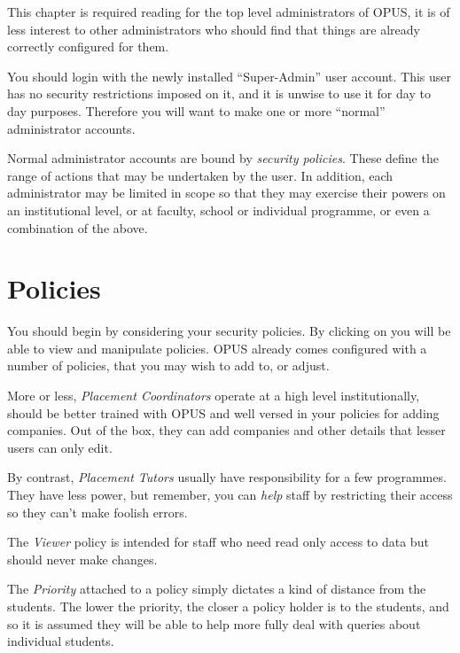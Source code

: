 \documentclass[12 pt]{book}
\begin{document}
This chapter is required reading for the top level administrators of OPUS, it
is of less interest to other administrators who should find that things are
already correctly configured for them.

You should login with the newly installed ``Super-Admin'' user account. This
user has no security restrictions imposed on it, and it is unwise to use it
for day to day purposes. Therefore you will want to make one or more ``normal''
administrator accounts.


Normal administrator accounts are bound by \emph{security policies}. These
define the range of actions that may be undertaken by the user. In addition, 
each administrator may be limited in scope so that they may exercise their
powers on an institutional level, or at faculty, school or individual
programme, or even a combination of the above.

\section{Policies}
\label{Policies}

You should begin by considering your security policies. By clicking on
 you will be able to view and manipulate
policies. OPUS already comes configured with a number of policies, that you may
wish to add to, or adjust.

More or less, \emph{Placement Coordinators} operate at a high level
institutionally, should be better trained with OPUS and well versed in your
policies for adding companies. Out of the box, they can add companies and other
details that lesser users can only edit.

By contrast, \emph{Placement Tutors} usually have responsibility for a few
programmes. They have less power, but remember, you can \emph{help} staff by
restricting their access so they can't make foolish errors.

The \emph{Viewer} policy is intended for staff who need read only access to
data but should never make changes.

The \emph{Priority} attached to a policy simply dictates a kind of distance
from the students. The lower the priority, the closer a policy holder is to
the students, and so it is assumed they will be able to help more fully deal
with queries about individual students.
\end{document}
